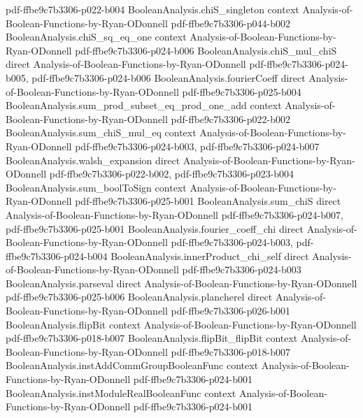\begin{theorem}
  {pdf-ffbe9c7b3306-p022-b004}
\proofstep
  {BooleanAnalysis.chiS_singleton}
  {context}
  {Analysis-of-Boolean-Functions-by-Ryan-ODonnell}
  {pdf-ffbe9c7b3306-p044-b002}
\proofstep
  {BooleanAnalysis.chiS_sq_eq_one}
  {context}
  {Analysis-of-Boolean-Functions-by-Ryan-ODonnell}
  {pdf-ffbe9c7b3306-p024-b006}
\proofstep
  {BooleanAnalysis.chiS_mul_chiS}
  {direct}
  {Analysis-of-Boolean-Functions-by-Ryan-ODonnell}
  {pdf-ffbe9c7b3306-p024-b005,
    pdf-ffbe9c7b3306-p024-b006}
\proofstep
  {BooleanAnalysis.fourierCoeff}
  {direct}
  {Analysis-of-Boolean-Functions-by-Ryan-ODonnell}
  {pdf-ffbe9c7b3306-p025-b004}
\proofstep
  {BooleanAnalysis.sum_prod_subset_eq_prod_one_add}
  {context}
  {Analysis-of-Boolean-Functions-by-Ryan-ODonnell}
  {pdf-ffbe9c7b3306-p022-b002}
\proofstep
  {BooleanAnalysis.sum_chiS_mul_eq}
  {context}
  {Analysis-of-Boolean-Functions-by-Ryan-ODonnell}
  {pdf-ffbe9c7b3306-p024-b003,
    pdf-ffbe9c7b3306-p024-b007}
\proofstep
  {BooleanAnalysis.walsh_expansion}
  {direct}
  {Analysis-of-Boolean-Functions-by-Ryan-ODonnell}
  {pdf-ffbe9c7b3306-p022-b002,
    pdf-ffbe9c7b3306-p023-b004}
\proofstep
  {BooleanAnalysis.sum_boolToSign}
  {context}
  {Analysis-of-Boolean-Functions-by-Ryan-ODonnell}
  {pdf-ffbe9c7b3306-p025-b001}
\proofstep
  {BooleanAnalysis.sum_chiS}
  {direct}
  {Analysis-of-Boolean-Functions-by-Ryan-ODonnell}
  {pdf-ffbe9c7b3306-p024-b007,
    pdf-ffbe9c7b3306-p025-b001}
\proofstep
  {BooleanAnalysis.fourier_coeff_chi}
  {direct}
  {Analysis-of-Boolean-Functions-by-Ryan-ODonnell}
  {pdf-ffbe9c7b3306-p024-b003,
    pdf-ffbe9c7b3306-p024-b004}
\proofstep
  {BooleanAnalysis.innerProduct_chi_self}
  {direct}
  {Analysis-of-Boolean-Functions-by-Ryan-ODonnell}
  {pdf-ffbe9c7b3306-p024-b003}
\proofstep
  {BooleanAnalysis.parseval}
  {direct}
  {Analysis-of-Boolean-Functions-by-Ryan-ODonnell}
  {pdf-ffbe9c7b3306-p025-b006}
\proofstep
  {BooleanAnalysis.plancherel}
  {direct}
  {Analysis-of-Boolean-Functions-by-Ryan-ODonnell}
  {pdf-ffbe9c7b3306-p026-b001}
\proofstep
  {BooleanAnalysis.flipBit}
  {context}
  {Analysis-of-Boolean-Functions-by-Ryan-ODonnell}
  {pdf-ffbe9c7b3306-p018-b007}
\proofstep
  {BooleanAnalysis.flipBit_flipBit}
  {context}
  {Analysis-of-Boolean-Functions-by-Ryan-ODonnell}
  {pdf-ffbe9c7b3306-p018-b007}
\proofstep
  {BooleanAnalysis.instAddCommGroupBooleanFunc}
  {context}
  {Analysis-of-Boolean-Functions-by-Ryan-ODonnell}
  {pdf-ffbe9c7b3306-p024-b001}
\proofstep
  {BooleanAnalysis.instModuleRealBooleanFunc}
  {context}
  {Analysis-of-Boolean-Functions-by-Ryan-ODonnell}
  {pdf-ffbe9c7b3306-p024-b001}
\proofstep

\end{theorem}
